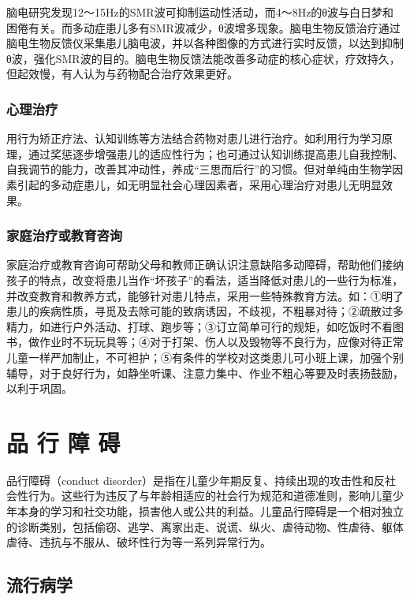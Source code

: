 脑电研究发现12～15Hz的SMR波可抑制运动性活动，而4～8Hz的θ波与白日梦和困倦有关。而多动症患儿多有SMR波减少，θ波增多现象。脑电生物反馈治疗通过脑电生物反馈仪采集患儿脑电波，并以各种图像的方式进行实时反馈，以达到抑制θ波，强化SMR波的目的。脑电生物反馈法能改善多动症的核心症状，疗效持久，但起效慢，有人认为与药物配合治疗效果更好。

\subsubsection{心理治疗}

用行为矫正疗法、认知训练等方法结合药物对患儿进行治疗。如利用行为学习原理，通过奖惩逐步增强患儿的适应性行为；也可通过认知训练提高患儿自我控制、自我调节的能力，改善其冲动性，养成“三思而后行”的习惯。但对单纯由生物学因素引起的多动症患儿，如无明显社会心理因素者，采用心理治疗对患儿无明显效果。

\subsubsection{家庭治疗或教育咨询}

家庭治疗或教育咨询可帮助父母和教师正确认识注意缺陷多动障碍，帮助他们接纳孩子的特点，改变将患儿当作“坏孩子”的看法，适当降低对患儿的一些行为标准，并改变教育和教养方式，能够针对患儿特点，采用一些特殊教育方法。如：①明了患儿的疾病性质，寻觅及去除可能的致病诱因，不歧视，不粗暴对待；②疏散过多精力，如进行户外活动、打球、跑步等；③订立简单可行的规矩，如吃饭时不看图书，做作业时不玩玩具等；④对于打架、伤人以及毁物等不良行为，应像对待正常儿童一样严加制止，不可袒护；⑤有条件的学校对这类患儿可小班上课，加强个别辅导，对于良好行为，如静坐听课、注意力集中、作业不粗心等要及时表扬鼓励，以利于巩固。

\section{品 行 障 碍}

品行障碍（conduct
disorder）是指在儿童少年期反复、持续出现的攻击性和反社会性行为。这些行为违反了与年龄相适应的社会行为规范和道德准则，影响儿童少年本身的学习和社交功能，损害他人或公共的利益。儿童品行障碍是一个相对独立的诊断类别，包括偷窃、逃学、离家出走、说谎、纵火、虐待动物、性虐待、躯体虐待、违抗与不服从、破坏性行为等一系列异常行为。

\subsection{流行病学}

